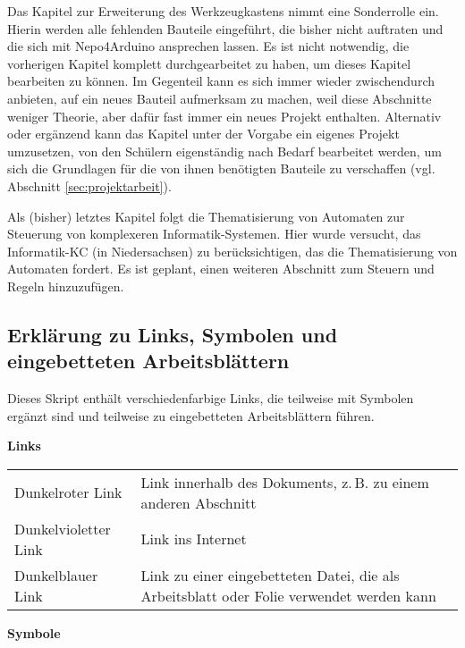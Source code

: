 Das Kapitel zur Erweiterung des Werkzeugkastens nimmt eine Sonderrolle ein. Hierin werden alle fehlenden Bauteile eingeführt, die bisher nicht auftraten und die sich mit Nepo4Arduino ansprechen lassen. Es ist nicht notwendig, die vorherigen Kapitel komplett durchgearbeitet zu haben, um dieses Kapitel bearbeiten zu können. Im Gegenteil kann es sich immer wieder zwischendurch anbieten, auf ein neues Bauteil aufmerksam zu machen, weil diese Abschnitte weniger Theorie, aber dafür fast immer ein neues Projekt enthalten. Alternativ oder ergänzend kann das Kapitel unter der Vorgabe ein eigenes Projekt umzusetzen, von den Schülern eigenständig nach Bedarf bearbeitet werden, um sich die Grundlagen für die von ihnen benötigten Bauteile zu verschaffen (vgl. Abschnitt \ref{sec:projektarbeit}).

Als (bisher) letztes Kapitel folgt die Thematisierung von Automaten zur Steuerung von komplexeren Informatik-Systemen. Hier wurde versucht, das Informatik-KC (in Niedersachsen) zu berücksichtigen, das die Thematisierung von Automaten fordert. Es ist geplant, einen weiteren Abschnitt zum Steuern und Regeln hinzuzufügen.

\subsection{Erklärung zu Links, Symbolen und eingebetteten Arbeitsblättern}

Dieses Skript enthält verschiedenfarbige Links, die teilweise mit Symbolen ergänzt sind und teilweise zu eingebetteten Arbeitsblättern führen.

\bigskip
\textbf{Links}

\medskip
\begin{tabu} to \textwidth {X[l]X[3l]}
	\textcolor{red!60!black}{Dunkelroter Link} & Link innerhalb des Dokuments, z.\,B. zu einem anderen Abschnitt \\
	\textcolor{magenta!60!black}{Dunkelvioletter Link} & Link ins Internet \\
	\textcolor{blue!60!black}{Dunkelblauer Link} & Link zu einer eingebetteten Datei, die als Arbeitsblatt oder Folie verwendet werden kann\\
\end{tabu}

\bigskip
\textbf{Symbole}

